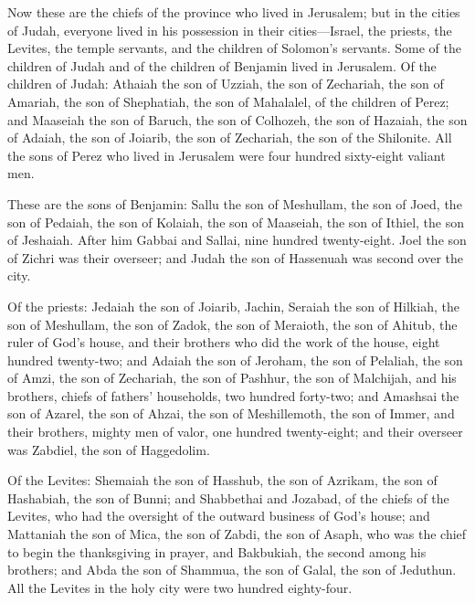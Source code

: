  Now these are the chiefs of the province who lived in
Jerusalem; but in the cities of Judah, everyone lived in his possession
in their cities---Israel, the priests, the Levites, the temple servants,
and the children of Solomon's servants.  Some of the
children of Judah and of the children of Benjamin lived in Jerusalem. Of
the children of Judah: Athaiah the son of Uzziah, the son of Zechariah,
the son of Amariah, the son of Shephatiah, the son of Mahalalel, of the
children of Perez;  and Maaseiah the son of Baruch, the
son of Colhozeh, the son of Hazaiah, the son of Adaiah, the son of
Joiarib, the son of Zechariah, the son of the Shilonite. 
All the sons of Perez who lived in Jerusalem were four hundred
sixty-eight valiant men.

 These are the sons of Benjamin: Sallu the son of
Meshullam, the son of Joed, the son of Pedaiah, the son of Kolaiah, the
son of Maaseiah, the son of Ithiel, the son of Jeshaiah. 
After him Gabbai and Sallai, nine hundred twenty-eight. 
Joel the son of Zichri was their overseer; and Judah the son of
Hassenuah was second over the city.

 Of the priests: Jedaiah the son of Joiarib, Jachin,
 Seraiah the son of Hilkiah, the son of Meshullam, the
son of Zadok, the son of Meraioth, the son of Ahitub, the ruler of God's
house,  and their brothers who did the work of the house,
eight hundred twenty-two; and Adaiah the son of Jeroham, the son of
Pelaliah, the son of Amzi, the son of Zechariah, the son of Pashhur, the
son of Malchijah,  and his brothers, chiefs of fathers'
households, two hundred forty-two; and Amashsai the son of Azarel, the
son of Ahzai, the son of Meshillemoth, the son of Immer, 
and their brothers, mighty men of valor, one hundred twenty-eight; and
their overseer was Zabdiel, the son of Haggedolim.

 Of the Levites: Shemaiah the son of Hasshub, the son of
Azrikam, the son of Hashabiah, the son of Bunni;  and
Shabbethai and Jozabad, of the chiefs of the Levites, who had the
oversight of the outward business of God's house;  and
Mattaniah the son of Mica, the son of Zabdi, the son of Asaph, who was
the chief to begin the thanksgiving in prayer, and Bakbukiah, the second
among his brothers; and Abda the son of Shammua, the son of Galal, the
son of Jeduthun.  All the Levites in the holy city were
two hundred eighty-four.

